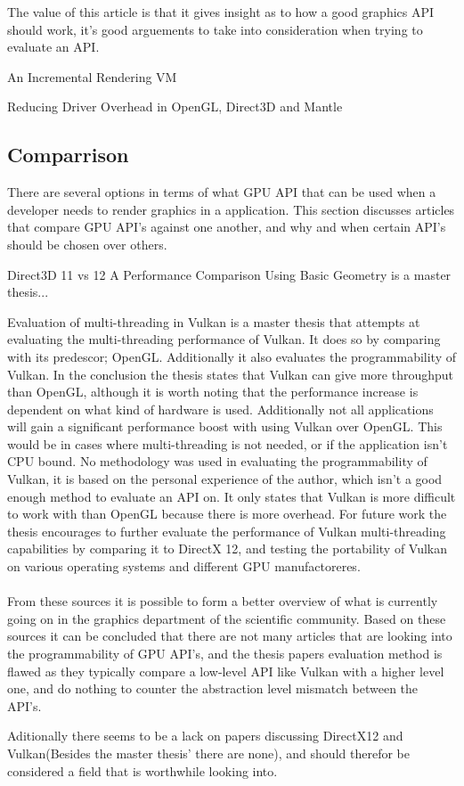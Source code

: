 The value of this article is that it gives insight as to how a good graphics \gls{API} should work, it's good arguements to take into consideration when trying to evaluate an \gls{API}.

An Incremental Rendering VM \cite{haaser_2015_incremental} 

Reducing Driver Overhead in OpenGL, Direct3D and Mantle  \cite{dobersberger_2015_reducing}

\subsection{Comparrison}
There are several options in terms of what \gls{GPU} \gls{API} that can be used when a developer needs to render graphics in a application. This section discusses articles that compare \gls{GPU} \gls{API}'s against one another, and why and when certain \gls{API}'s should be chosen over others.

Direct3D 11 vs 12 A Performance Comparison Using Basic Geometry \cite{2016_direct3d} is a master thesis...


Evaluation of multi-threading in Vulkan \cite{blackert_2016_evaluation} is a master thesis that attempts at evaluating the multi-threading performance of Vulkan. It does so by comparing with its predescor; OpenGL. 
Additionally it also evaluates the programmability of Vulkan. 
In the conclusion the thesis states that Vulkan can give more throughput than OpenGL, although it is worth noting that the performance increase is dependent on what kind of hardware is used. Additionally not all applications will gain a significant performance boost with using Vulkan over OpenGL. 
This would be in cases where multi-threading is not needed, or if the application isn't CPU bound. No methodology was used in evaluating the programmability of Vulkan, it is based on the personal experience of the author, which isn't a good enough method to evaluate an \gls{API} on. 
It only states that Vulkan is more difficult to work with than OpenGL because there is more overhead. 
For future work the thesis encourages to further evaluate the performance of Vulkan multi-threading  capabilities by comparing it to DirectX 12, and testing the portability of Vulkan on various operating systems and different \gls{GPU} manufactoreres.

\paragraph{}
From these sources it is possible to form a better overview of what is currently going on in the graphics department of the scientific community. Based on these sources it can be concluded that there are not many articles that are looking into the programmability of \gls{GPU} \gls{API}'s, and the thesis papers evaluation method is flawed as they typically compare a low-level \gls{API} like Vulkan with a higher level one, and do nothing to counter the abstraction level mismatch between the \gls{API}'s.

Aditionally there seems to be a lack on papers discussing DirectX12 and Vulkan(Besides the master thesis' there are none), and should therefor be considered a field that is worthwhile looking into.
